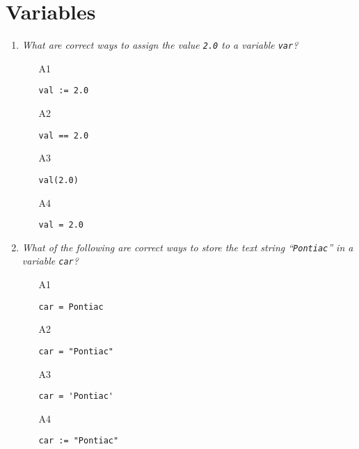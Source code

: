 
\section{Variables}

\begin{enumerate}
\item {\em What are correct ways to assign the value {\tt 2.0} to a variable {\tt var}?}\\

\begin{enumerate}
\item[A1] 
\begin{verbatim}
val := 2.0
\end{verbatim}
\item[A2] 
\begin{verbatim}
val == 2.0
\end{verbatim}
\item[A3] 
\begin{verbatim}
val(2.0)
\end{verbatim}
\item[A4] 
\begin{verbatim}
val = 2.0
\end{verbatim}
\end{enumerate}

\vspace{6mm}

\item {\em What of the following are correct ways to store the text string ``{\tt Pontiac}'' in a variable {\tt car}?}\\

\begin{enumerate}
\item[A1] 
\begin{verbatim}
car = Pontiac
\end{verbatim}
\item[A2] 
\begin{verbatim}
car = "Pontiac"
\end{verbatim}
\item[A3] 
\begin{verbatim}
car = 'Pontiac'
\end{verbatim}
\item[A4] 
\begin{verbatim}
car := "Pontiac"
\end{verbatim}
\end{enumerate}


\end{enumerate}
